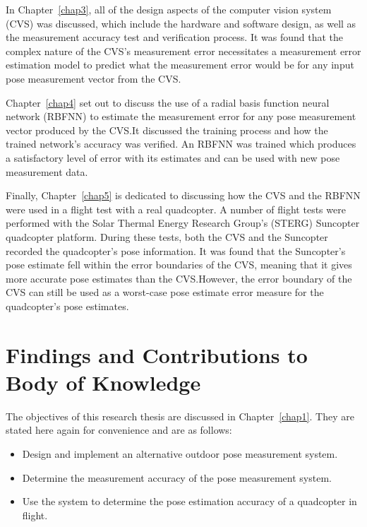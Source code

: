 In Chapter~\ref{chap3}, all of the design aspects of the computer vision system (CVS) was discussed, which include the hardware and software design, as well as the measurement accuracy test and verification process. It was found that the complex nature of the CVS's measurement error necessitates a measurement error estimation model to predict what the measurement error would be for any input pose measurement vector from the CVS.\@ 

Chapter~\ref{chap4} set out to discuss the use of a radial basis function neural network (RBFNN) to estimate the measurement error for any pose measurement vector produced by the CVS.\@ It discussed the training process and how the trained network's accuracy was verified. An RBFNN was trained which produces a satisfactory level of error with its estimates and can be used with new pose measurement data.

Finally, Chapter~\ref{chap5} is dedicated to discussing how the CVS and the RBFNN were used in a flight test with a real quadcopter. A number of flight tests were performed with the Solar Thermal Energy Research Group's (STERG) Suncopter quadcopter platform. During these tests, both the CVS and the Suncopter recorded the quadcopter's pose information. It was found that the Suncopter's pose estimate fell within the error boundaries of the CVS, meaning that it gives more accurate pose estimates than the CVS.\@ However, the error boundary of the CVS can still be used as a worst-case pose estimate error measure for the quadcopter's pose estimates. 

\section{Findings and Contributions to Body of Knowledge}

The objectives of this research thesis are discussed in Chapter~\ref{chap1}. They are stated here again for convenience and are as follows:

\begin{itemize}
  \item Design and implement an alternative outdoor pose measurement system.
  \item Determine the measurement accuracy of the pose measurement system.
  \item Use the system to determine the pose estimation accuracy of a quadcopter in flight. 
\end{itemize}


